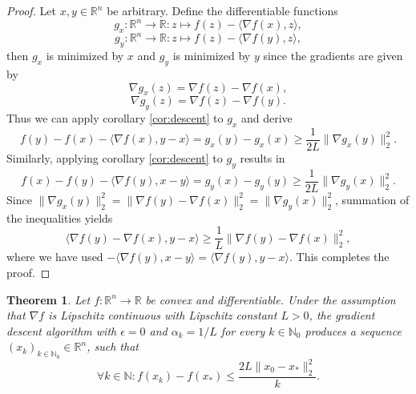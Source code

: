 \documentclass[11pt, a4paper]{article}
\newtheorem{theorem}{Theorem}[section]
\newcommand{\N}{\mathds{N}}
\newcommand{\R}{\mathds{R}}
\begin{document}
\begin{proof}
Let $x,y \in \R^n$ be arbitrary. Define the differentiable functions
\[ g_x: \R^n \to \R : z \mapsto f(z) - \big \langle \nabla f(x), z \big \rangle, \]
\[ g_y: \R^n \to \R : z \mapsto f(z) - \big \langle \nabla f(y), z \big \rangle, \]
then $g_x$ is minimized by $x$ and $g_y$ is minimized by $y$ since the gradients are given by
\[ \nabla g_x(z) = \nabla f(z) - \nabla f(x), \]
\[ \nabla g_y(z) = \nabla f(z) - \nabla f(y). \]
Thus we can apply corollary \ref{cor:descent} to $g_x$ and derive
\[ f(y) - f(x) - \big \langle \nabla f(x) , y-x \big \rangle = g_x(y) - g_x(x) \geq \frac{1}{2L} \big \| \nabla g_x(y) \big \|_2^2. \]
Similarly, applying corollary \ref{cor:descent} to $g_y$ results in
\[ f(x) - f(y) - \big \langle \nabla f(y) , x-y \big \rangle = g_y(x) - g_y(y) \geq \frac{1}{2L} \big \| \nabla g_y(x) \big \|_2^2. \]
Since $ \big \| \nabla g_x(y) \big \|_2^2 = \big \| \nabla f(y) - \nabla f(x) \big \|_2^2 = \big \| \nabla g_y(x) \big \|_2^2$, summation of the inequalities yields
\[ \big \langle \nabla f(y) - \nabla f(x),y-x \big \rangle \geq \frac{1}{L} \big \| \nabla f(y) - \nabla f(x) \big \|_2^2, \]
where we have used $- \big \langle \nabla f(y) , x-y \big \rangle = \big \langle \nabla f(y) , y-x \big \rangle$. This completes the proof.
\end{proof}

\begin{theorem}
Let $f: \R^n \to \R$ be convex and differentiable. Under the assumption that $\nabla f$ is Lipschitz continuous with Lipschitz constant $L>0$, the gradient descent algorithm with $\epsilon = 0$ and $\alpha_k = 1/L$ for every $k \in \N_0$ produces a sequence $(x_k)_{k \in \N_0} \in \R^n$, such that 
\[ \forall k \in \N : f(x_k) - f(x_*) \leq \frac{2L \big \| x_0 - x_* \big \|_2^2 }{k}. \]
\end{theorem}
\end{document}
